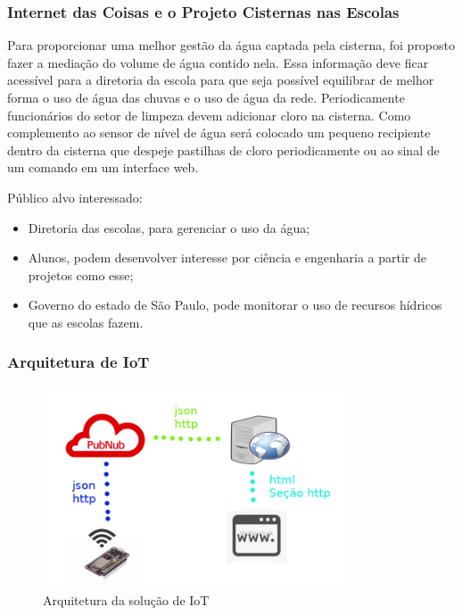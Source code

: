 \documentclass{beamer}
\begin{document}
\begin{frame}
\frametitle{Internet das Coisas e o Projeto Cisternas nas Escolas}
\begin{minipage}{\textwidth}

	\begin{block}{}
		Para proporcionar uma melhor gestão da água captada pela cisterna, foi proposto fazer a mediação do volume de água contido nela. Essa informação deve ficar acessível para a diretoria da escola para que seja possível equilibrar de melhor forma o uso de água das chuvas e o uso de água da rede. Periodicamente funcionários do setor de limpeza devem adicionar cloro na cisterna. Como complemento ao sensor de nível de água será colocado um pequeno recipiente dentro da cisterna que despeje pastilhas de cloro periodicamente ou ao sinal de um comando em um interface web.
	\end{block}

	Público alvo interessado:
	\begin{itemize}
		\item Diretoria das escolas, para gerenciar o uso da água;
		\item Alunos, podem desenvolver interesse por ciência e engenharia a partir de projetos como esse;
		\item Governo do estado de São Paulo, pode monitorar o uso de recursos hídricos que as escolas fazem.
	\end{itemize}
\end{minipage}
\end{frame}

\begin{frame}
\frametitle{Arquitetura de IoT}
\begin{minipage}{\textwidth}
		
	\begin{figure}[!ht]
		\centering
		\vspace{-20pt}
		\includegraphics[width=0.8\textwidth]{arquitetura_projeto.png}
		\caption{Arquitetura da solução de IoT}
		\label{fig:ndfgodsdfsde_power_pisdfdns}
	\end{figure}
	
\end{minipage}
\end{frame}
\end{document}
